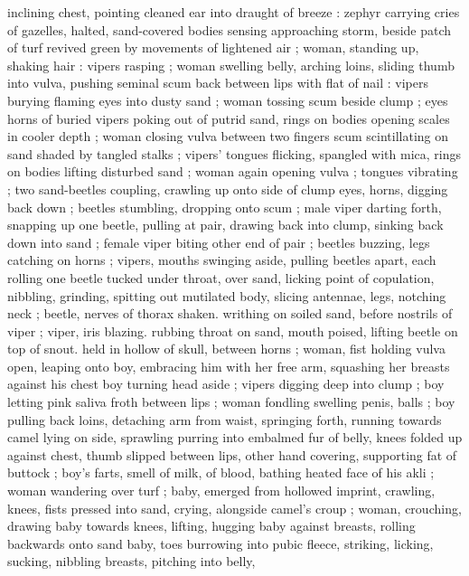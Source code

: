 inclining chest, pointing cleaned ear into draught of breeze : zephyr 
carrying cries of gazelles, halted, sand-covered bodies sensing 
approaching storm, beside patch of turf revived green by 
movements of lightened air ; woman, standing up, shaking hair : 
vipers rasping ; woman swelling belly, arching loins, sliding thumb 
into vulva, pushing seminal scum back between lips with flat of nail : 
vipers burying flaming eyes into dusty sand ; woman tossing scum 
beside clump ; eyes horns of buried vipers poking out of putrid 
sand, rings on bodies opening scales in cooler depth ; woman closing 
vulva between two fingers {\col} scum scintillating on sand shaded by 
tangled stalks ; vipers' tongues flicking, spangled with mica, rings on 
bodies lifting disturbed sand ; woman again opening vulva ; tongues 
vibrating ; two sand-beetles coupling, crawling up onto side of clump 
{\col} eyes, horns, digging back down ; beetles stumbling, dropping onto 
scum ; male viper darting forth, snapping up one beetle, pulling at 
pair, drawing back into clump, sinking back down into sand ; female 
viper biting other end of pair ; beetles buzzing, legs catching on 
horns ; vipers, mouths swinging aside, pulling beetles apart, each 
rolling one beetle tucked under throat, over sand, licking point of 
copulation, nibbling, grinding, spitting out mutilated body, slicing 
antennae, legs, notching neck ; beetle, nerves of thorax shaken. 
writhing on soiled sand, before nostrils of viper ; viper, iris blazing. 
rubbing throat on sand, mouth poised, lifting beetle on top of snout. 
held in hollow of skull, between horns ; woman, fist holding vulva 
open, leaping onto boy, embracing him with her free arm, squashing 
her breasts against his chest {\col} boy turning head aside ; vipers 
digging deep into clump ; boy letting pink saliva froth between lips ; 
woman fondling swelling penis, balls ; boy pulling back loins, 
detaching arm from waist, springing forth, running towards camel 
lying on side, sprawling purring into embalmed fur of belly, knees 
folded up against chest, thumb slipped between lips, other hand 
covering, supporting fat of buttock ; boy's farts, smell of milk, of 
blood, bathing heated face of his akli ; woman wandering over turf ; 
baby, emerged from hollowed imprint, crawling, knees, fists pressed 
into sand, crying, alongside camel's croup ; woman, crouching, 
drawing baby towards knees, lifting, hugging baby against breasts, 
rolling backwards onto sand {\col} baby, toes burrowing into pubic fleece, 
striking, licking, sucking, nibbling breasts, pitching into belly, 
